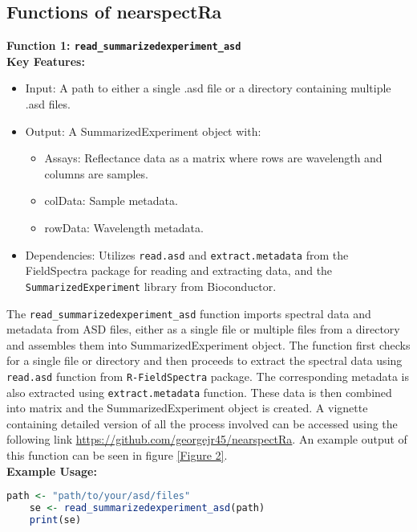 \documentclass[12pt,a4paper]{report}
\begin{document}
\subsection{Functions of nearspectRa}
\textbf{Function 1: \texttt{read\_summarizedexperiment\_asd}} \\

\textbf{Key Features:}
\begin{itemize}
    \item Input: A path to either a single .asd file or a directory containing multiple .asd files.
    \item Output: A SummarizedExperiment object with: 
    \begin{itemize}
        \item Assays: Reflectance data as a matrix where rows are wavelength and columns are samples.
        \item colData: Sample metadata.
        \item rowData: Wavelength metadata.
    \end{itemize}
    \item Dependencies: Utilizes \texttt{read.asd} and \texttt{extract.metadata} from the FieldSpectra package for reading and extracting data, and the \texttt{SummarizedExperiment} library from Bioconductor.
\end{itemize}

The \texttt{read\_summarizedexperiment\_asd} function imports spectral data and metadata from ASD files, either as a single file or multiple files from a directory and assembles them into SummarizedExperiment object. The function first checks for a single file or directory and then proceeds to extract the spectral data using \texttt{read.asd} function from \texttt{R-FieldSpectra} package. The corresponding metadata is also extracted using \texttt{extract.metadata} function. These data is then combined into matrix and the SummarizedExperiment object is created. A vignette containing detailed version of all the process involved can be accessed using the following link \url{https://github.com/georgejr45/nearspectRa}. An example output of this function can be seen in figure \ref{Figure 2}.\\

\textbf{Example Usage:}

\begin{lstlisting}[language=R, style=mystyle]
    path <- "path/to/your/asd/files"
    se <- read_summarizedexperiment_asd(path)
    print(se)
    \end{lstlisting}
\end{document}
